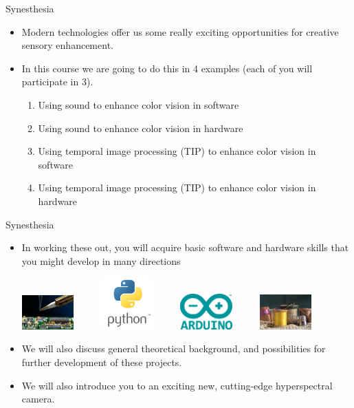 \documentclass{beamer}
\begin{document}
\begin{frame}{Synesthesia}
   \begin{itemize}
      \item Modern technologies offer us some really exciting opportunities for creative sensory enhancement.
      \item In this course we are going to do this in 4 examples (each of you will participate in 3).
      \begin{enumerate}
         \item Using sound to enhance color vision in software
         \item Using sound to enhance color vision in hardware
         \item Using temporal image processing (TIP) to enhance color vision in software
         \item Using temporal image processing (TIP) to enhance color vision in hardware
      \end{enumerate}
   \end{itemize}
\end{frame}

\begin{frame}{Synesthesia}
   \begin{itemize}
      \item In working these out, you will acquire basic software and hardware skills that you might develop in many directions \\
      \begin{center}
      \includegraphics[width=2cm]{figures/solder.jpg}
      ~ ~ ~
      \includegraphics[width=2cm]{figures/python.png}
      ~ ~ ~
      \includegraphics[width=2cm]{figures/arduino.png}
      ~ ~ ~
      \includegraphics[width=2cm]{figures/sew.jpg}
      \end{center}
      \item We will also discuss general theoretical background, and possibilities for further development of these projects.
      \item We will also introduce you to an exciting new, cutting-edge hyperspectral camera.
   \end{itemize}
\end{frame}
\end{document}
